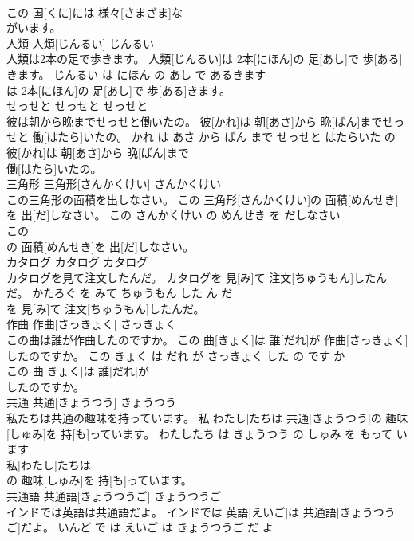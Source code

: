 \documentclass[8pt]{extreport}
\begin{document}
\begin{CJK}{UTF8}{min}
\\	この 国[くに]には 様々[さまざま]な
\\	がいます。			
\\	人類	人類[じんるい]	じんるい	
\\	人類は2本の足で歩きます。	人類[じんるい]は 2本[にほん]の 足[あし]で 歩[ある]きます。	じんるい は にほん の あし で あるきます	
\\	は 2本[にほん]の 足[あし]で 歩[ある]きます。			
\\	せっせと	せっせと	せっせと	
\\	彼は朝から晩までせっせと働いたの。	彼[かれ]は 朝[あさ]から 晩[ばん]までせっせと 働[はたら]いたの。	かれ は あさ から ばん まで せっせと はたらいた の	
\\	彼[かれ]は 朝[あさ]から 晩[ばん]まで
\\	働[はたら]いたの。			
\\	三角形	三角形[さんかくけい]	さんかくけい	
\\	この三角形の面積を出しなさい。	この 三角形[さんかくけい]の 面積[めんせき]を 出[だ]しなさい。	この さんかくけい の めんせき を だしなさい	
\\	この
\\	の 面積[めんせき]を 出[だ]しなさい。			
\\	カタログ	カタログ	カタログ	
\\	カタログを見て注文したんだ。	カタログを 見[み]て 注文[ちゅうもん]したんだ。	かたろぐ を みて ちゅうもん した ん だ	
\\	を 見[み]て 注文[ちゅうもん]したんだ。			
\\	作曲	作曲[さっきょく]	さっきょく	
\\	この曲は誰が作曲したのですか。	この 曲[きょく]は 誰[だれ]が 作曲[さっきょく]したのですか。	この きょく は だれ が さっきょく した の です か	
\\	この 曲[きょく]は 誰[だれ]が
\\	したのですか。			
\\	共通	共通[きょうつう]	きょうつう	
\\	私たちは共通の趣味を持っています。	私[わたし]たちは 共通[きょうつう]の 趣味[しゅみ]を 持[も]っています。	わたしたち は きょうつう の しゅみ を もって います	
\\	私[わたし]たちは
\\	の 趣味[しゅみ]を 持[も]っています。			
\\	共通語	共通語[きょうつうご]	きょうつうご	
\\	インドでは英語は共通語だよ。	インドでは 英語[えいご]は 共通語[きょうつうご]だよ。	いんど で は えいご は きょうつうご だ よ	

\end{CJK}
\end{document}
